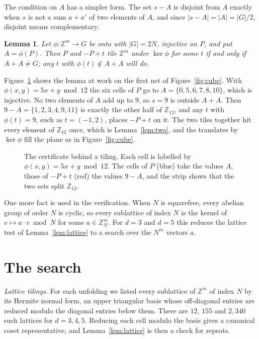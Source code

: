 \documentclass[11pt]{amsart}
\newtheorem{lemma}[theorem]{Lemma}
\theoremstyle{definition}
\theoremstyle{remark}
\newcommand{\Z}{\mathbb{Z}}
\begin{document}
The condition on $A$ has a simpler form. The set $s-A$ is disjoint from $A$ exactly when $s$ is not a sum $a+a'$ of two elements of $A$, and since $|s-A|=|A|=|G|/2$, disjoint means complementary.

\begin{lemma}\label{lem:sumset}
Let $\phi\colon\Z^m\to G$ be onto with $|G|=2N$, injective on $P$, and put $A=\phi(P)$. Then $P$ and $-P+t$ tile $\Z^m$ under $\ker\phi$ for some $t$ if and only if $A+A\ne G$; any $t$ with $\phi(t)\notin A+A$ will do.
\end{lemma}

Figure~\ref{fig:mechanism} shows the lemma at work on the first net of Figure~\ref{fig:cube}. With $\phi(x,y)=5x+y \bmod 12$ the six cells of $P$ go to $A=\{0,5,6,7,8,10\}$, which is injective. No two elements of $A$ add up to $9$, so $s=9$ is outside $A+A$. Then $9-A=\{1,2,3,4,9,11\}$ is exactly the other half of $\Z_{12}$, and any $t$ with $\phi(t)=9$, such as $t=(-1,2)$, places $-P+t$ on it. The two tiles together hit every element of $\Z_{12}$ once, which is Lemma~\ref{lem:two}, and the translates by $\ker\phi$ fill the plane as in Figure~\ref{fig:cube}.

\begin{figure}[ht]
\centering

\caption{The certificate behind a tiling. Each cell is labelled by $\phi(x,y)=5x+y\bmod 12$. The cells of $P$ (blue) take the values $A$, those of $-P+t$ (red) the values $9-A$, and the strip shows that the two sets split $\Z_{12}$.}
\label{fig:mechanism}
\end{figure}

One more fact is used in the verification. When $N$ is squarefree, every abelian group of order $N$ is cyclic, so every sublattice of index $N$ is the kernel of $v\mapsto a\cdot v \bmod N$ for some $a\in\Z_N^m$. For $d=3$ and $d=5$ this reduces the lattice test of Lemma~\ref{lem:lattice} to a search over the $N^m$ vectors $a$.

\section{The search}\label{sec:search}

\emph{Lattice tilings.} For each unfolding we listed every sublattice of $\Z^m$ of index $N$ by its Hermite normal form, an upper triangular basis whose off-diagonal entries are reduced modulo the diagonal entries below them. There are $12$, $155$ and $2{,}340$ such lattices for $d=3,4,5$. Reducing each cell modulo the basis gives a canonical coset representative, and Lemma~\ref{lem:lattice} is then a check for repeats.
\end{document}
